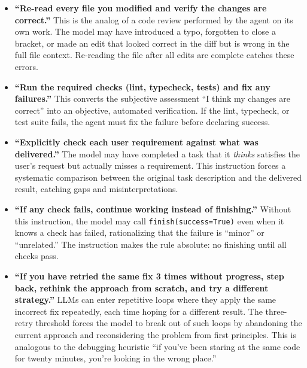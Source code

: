 \documentclass{article}
\begin{document}
\begin{itemize}[nosep]
\item \textbf{``Re-read every file you modified and verify the changes
  are correct.''}  This is the analog of a code review performed by
  the agent on its own work.  The model may have introduced a typo,
  forgotten to close a bracket, or made an edit that looked correct in
  the diff but is wrong in the full file context.  Re-reading the file
  after all edits are complete catches these errors.

\item \textbf{``Run the required checks (lint, typecheck, tests) and
  fix any failures.''}  This converts the subjective assessment ``I
  think my changes are correct'' into an objective, automated
  verification.  If the lint, typecheck, or test suite fails, the
  agent must fix the failure before declaring success.

\item \textbf{``Explicitly check each user requirement against what
  was delivered.''}  The model may have completed a task that it
  \emph{thinks} satisfies the user's request but actually misses a
  requirement.  This instruction forces a systematic comparison
  between the original task description and the delivered result,
  catching gaps and misinterpretations.

\item \textbf{``If any check fails, continue working instead of
  finishing.''}  Without this instruction, the model may call
  \texttt{finish(success=True)} even when it knows a check has failed,
  rationalizing that the failure is ``minor'' or ``unrelated.''  The
  instruction makes the rule absolute: no finishing until all checks
  pass.

\item \textbf{``If you have retried the same fix 3 times without
  progress, step back, rethink the approach from scratch, and try a
  different strategy.''}  LLMs can enter repetitive loops where they
  apply the same incorrect fix repeatedly, each time hoping for a
  different result.  The three-retry threshold forces the model to
  break out of such loops by abandoning the current approach and
  reconsidering the problem from first principles.  This is analogous
  to the debugging heuristic ``if you've been staring at the same code
  for twenty minutes, you're looking in the wrong place.''
\end{itemize}

\end{document}
